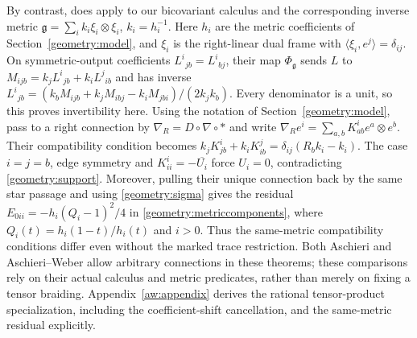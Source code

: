 \documentclass[11pt,a4paper]{article}
\theoremstyle{remark}\newtheorem{remark}[theorem]{Remark}
\begin{document}
By contrast, \cite[Theorem~5.7]{orig-aw25} does apply to our bicovariant
calculus and the corresponding inverse metric
$\mathfrak g=\sum_i k_i\xi_i\otimes\xi_i$, $k_i=h_i^{-1}$.
Here $h_i$ are the metric coefficients of Section~\ref{geometry:model},
and $\xi_i$ is the right-linear dual frame with
$\langle\xi_i,e^j\rangle=\delta_{ij}$.
On symmetric-output coefficients $L^i{}_{jb}=L^i{}_{bj}$, their map
$\Phi_{\mathfrak g}$ sends $L$ to
$M_{ijb}=k_jL^i{}_{jb}+k_iL^j{}_{ib}$ and has inverse
$L^i{}_{jb}=(k_bM_{ijb}+k_jM_{ibj}-k_iM_{jbi})/(2k_jk_b)$.
Every denominator is a unit, so this proves invertibility here.
Using the notation of Section~\ref{geometry:model}, pass to a right
connection by $\nabla_R=D\circ\nabla\circ *$ and write
$\nabla_Re^i=\sum_{a,b}K^i_{ab}e^a\otimes e^b$.
Their compatibility condition
\cite[Definition~5.3(ii)]{orig-aw25} becomes
$k_jK^i_{jb}+k_iK^j_{ib}=\delta_{ij}(R_bk_i-k_i)$.
The case $i=j=b$, edge symmetry and
$K^i_{ii}=-\overline{U_i}$ force $U_i=0$, contradicting
\eqref{geometry:support}.  Moreover, pulling their unique connection
back by the same star passage and using \eqref{geometry:sigma} gives
the residual $E_{0ii}=-h_i(Q_i-1)^2/4$ in
\eqref{geometry:metriccomponents}, where
$Q_i(t)=h_i(1-t)/h_i(t)$ and $i>0$.  Thus the same-metric compatibility
conditions differ even without the marked trace restriction.
Both Aschieri and Aschieri--Weber allow arbitrary connections in these
theorems; these comparisons rely on their actual calculus and metric
predicates, rather than merely on fixing a tensor braiding.
Appendix~\ref{aw:appendix} derives the rational tensor-product
specialization, including the coefficient-shift cancellation, and the
same-metric residual explicitly.
\end{document}
